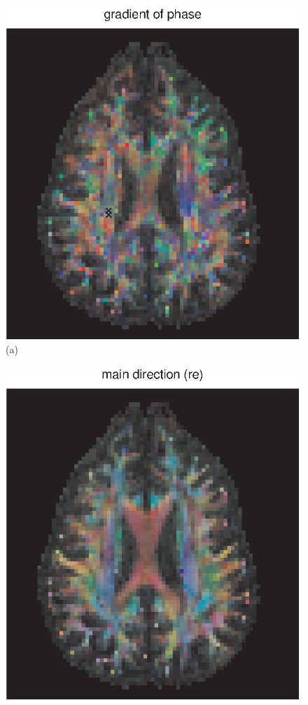\documentclass[authoryear,preprint,12pt]{elsarticle}
\begin{document}
\begin{figure}[p]
  \begin{center}
    \begin{minipage}[]{.42\textwidth}
      \centering
      \includegraphics[width=\textwidth]{gradphasebu.eps}
      (a)
      \end{minipage}
      \begin{minipage}[]{.42\textwidth}
      \centering
      \includegraphics[width=\textwidth]{maindirecreal.eps}

\end{minipage}
\end{center}
\end{figure}
\end{document}
